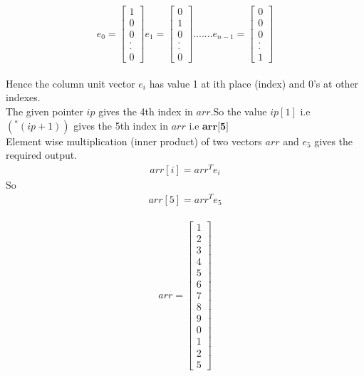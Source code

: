 \documentclass[journal,12pt,twocolumn]{IEEEtran}
\begin{document}
$$
	e_{0} = 
	\begin{bmatrix}
		1
		\\
		0
		\\
		0
		\\
		.
		\\
		.
		\\
		0
	\end{bmatrix}
	e_{1} = 
	\begin{bmatrix}
		0
		\\
		1
		\\
		0
		\\
		.
		\\
		.
		\\
		0
	\end{bmatrix}
	.......
	e_{n-1} = 
	\begin{bmatrix}
		0
		\\
		0
		\\
		0
		\\
		.
		\\
		.
		\\
		1
	\end{bmatrix}
$$
\\
Hence the column unit vector $e_{i}$ has value 1 at ith place (index) and 0's at other indexes. 
\\
The given pointer $ip$ gives the 4th index in $arr$.So the value $ip[1]$ i.e $(^{*}(ip+1))$ gives the 5th index in $arr$ i.e $\textbf{arr[5]}$
\\
Element wise multiplication (inner product) of two vectors $arr$ and $e_{5}$ gives the required output.
\\
\begin{align}
arr[i] = arr^{T}e_{i}
\end{align}
So 
\begin{align}
arr[5] = arr^{T}e_{5}
\end{align}
\\
\[
	arr = 
	\begin{bmatrix}
		1 
		\\
		2
		\\
		3
		\\
		4
		\\
		5
		\\
		6
		\\
		7
		\\
		8
		\\
		9
		\\
		0
		\\
		1
		\\
		2
		\\
		5
	\end{bmatrix}
\]
\end{document}
